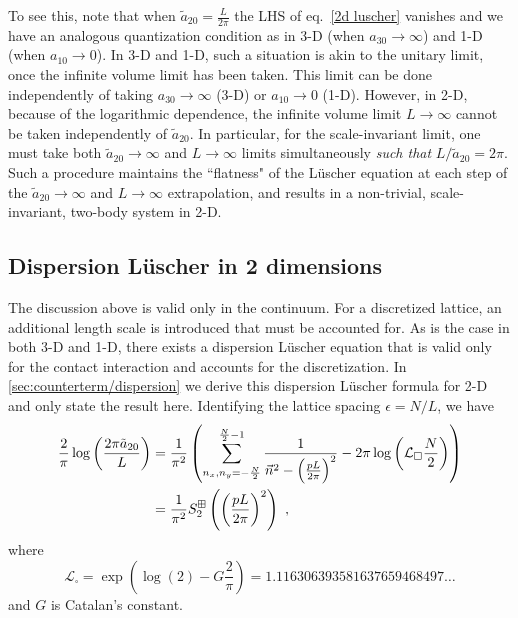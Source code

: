 To see this, note that when $\tilde a_{20}=\frac{L}{2\pi}$ the LHS of eq.~\eqref{2d luscher} vanishes and we have an analogous quantization condition as in 3-D (when $a_{30}\to\infty$) and 1-D (when $a_{10}\to 0$).  In 3-D and 1-D, such a situation is akin to the unitary limit, once the infinite volume limit has been taken.  This limit can be done independently of taking $a_{30}\to\infty$ (3-D) or $a_{10}\to0$ (1-D).  However, in 2-D, because of the logarithmic dependence, the infinite volume limit $L\to\infty$ cannot be taken independently of $\tilde a_{20}$.  In particular, for the scale-invariant limit, one must take both $\tilde a_{20}\to \infty$ and $L\to\infty$ limits simultaneously \emph{such that} $L/\tilde a_{20}=2\pi$.  Such a procedure maintains the ``flatness" of the L\"uscher equation at each step of the $\tilde a_{20}\to\infty$ and $L\to\infty$ extrapolation, and results in a non-trivial, scale-invariant, two-body system in 2-D.  

\subsection{Dispersion L\"uscher in 2 dimensions}
The discussion above is valid only in the continuum.  For a discretized lattice, an additional length scale is introduced that must be accounted for.  As is the case in both 3-D and 1-D, there exists a dispersion L\"uscher equation that is valid only for the contact interaction and accounts for the discretization.  In \autoref{sec:counterterm/dispersion} we derive this dispersion L\"uscher formula for 2-D and only state the result here.  Identifying the lattice spacing $\epsilon=N/L$, we have
\begin{align}
\frac{2}{\pi} \log \left(\frac{2\pi \tilde a_{20}}{L}\right)&=\frac{1}{\pi^2}\left( \sum_{n_x,n_y=-\frac{N}{2}}^{\frac{N}{2}-1}\frac{1}{\vec{n}^2-\left(\frac{pL}{2\pi}\right)^2}-2\pi \log \left(\mathcal{L}_\square\frac{N}{2}\right)\right)\nonumber\\
&=\frac{1}{\pi^2}S^{\dispersion}_2\left(\left(\frac{pL}{2\pi}\right)^2\right)\ ,\label{eq:2d dispersion luscher}
\end{align}
where
\begin{equation}
\mathcal{L}_{\square}=\exp \left(\log (2)-G \frac{2}{\pi}\right)=1.116306393581637659468497 \ldots
\end{equation}
and $G$ is Catalan's constant.  


